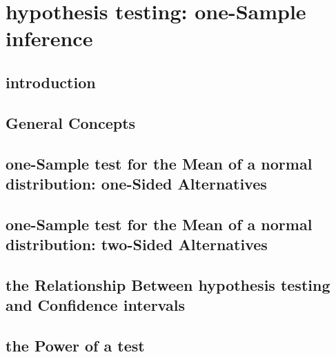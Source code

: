 \documentclass[12pt,]{article}
\begin{document}
\hypertarget{hypothesis-testing-one-sample-inference}{%
\section{hypothesis testing: one-Sample
inference}\label{hypothesis-testing-one-sample-inference}}

\hypertarget{introduction-3}{%
\subsection{introduction}\label{introduction-3}}

\hypertarget{general-concepts-1}{%
\subsection{General Concepts}\label{general-concepts-1}}

\hypertarget{one-sample-test-for-the-mean-of-a-normal-distribution-one-sided-alternatives}{%
\subsection{one-Sample test for the Mean of a normal distribution:
one-Sided
Alternatives}\label{one-sample-test-for-the-mean-of-a-normal-distribution-one-sided-alternatives}}

\hypertarget{one-sample-test-for-the-mean-of-a-normal-distribution-two-sided-alternatives}{%
\subsection{one-Sample test for the Mean of a normal distribution:
two-Sided
Alternatives}\label{one-sample-test-for-the-mean-of-a-normal-distribution-two-sided-alternatives}}

\hypertarget{the-relationship-between-hypothesis-testing-and-confidence-intervals}{%
\subsection{the Relationship Between hypothesis testing and Confidence
intervals}\label{the-relationship-between-hypothesis-testing-and-confidence-intervals}}

\hypertarget{the-power-of-a-test}{%
\subsection{the Power of a test}\label{the-power-of-a-test}}
\end{document}
